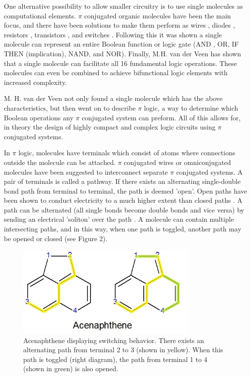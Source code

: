 \documentclass[12pt]{article}
\begin{document}
One alternative possibility to allow smaller circuitry is to use single molecules as computational elements. $\pi$ conjugated organic molecules have been the main focus, and there have been solutions to make them perform as wires \cite{9}, diodes \cite{10,11}, resistors \cite{12,13}, transistors \cite{14, 15, 16, 17}, and switches \cite{18, 19}. Following this it was shown a single molecule can represent an entire Boolean function or logic gate (AND\cite{20} , OR\cite{21}, IF THEN (implication)\cite{22}, NAND\cite{23}, and NOR\cite{24}). Finally, M.H. van der Veen \cite{v06} has shown that a single molecule can facilitate all 16 fundamental logic operations. These molecules can even be combined to achieve bifunctional logic elements with increased complexity.

M. H. van der Veen \cite{v06} not only found a single molecule which has the above characteristics, but then went on to describe $\pi$ logic, a way to determine which Boolean operations any $\pi$ conjugated system can preform. All of this allows for, in theory the design of highly compact and complex logic circuits using $\pi$ conjugated systems. 

In $\pi$ logic, molecules have terminals which consist of atoms where connections outside the molecule can be attached. $\pi$ conjugated wires \cite{9} or omniconjugated molecules \cite{OmniConj} have been suggested to interconnect separate $\pi$ conjugated systems. A pair of terminals is called a pathway. If there exists an alternating single-double bond path from terminal to terminal, the path is deemed 'open'. Open paths have been shown to conduct electricity to a much higher extent than closed paths \cite{openPath}. A path can be alternated (all single bonds become double bonds and vice versa) by sending an electrical 'soliton' over the path \cite{HK88}. A molecule can contain multiple intersecting paths, and in this way, when one path is toggled, another path may be opened or closed (see Figure 2).

\begin{figure}[ht!]
\centering
\includegraphics[width=90mm]{AcenaphtheneHighlighted.jpg}
\caption{Acenaphthene displaying switching behavior. There exists an alternating path from terminal 2 to 3 (shown in yellow). When this path is toggled (right diagram), the path from terminal 1 to 4 (shown in green) is also opened.}
\end{figure}
\end{document}
